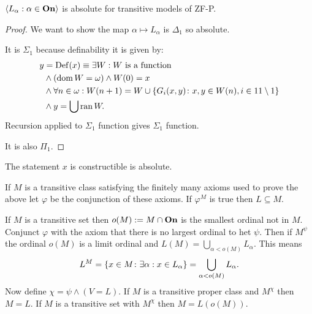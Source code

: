 \begin{proposition}
    \(\left<L_{\alpha}:\alpha\in{\bf On}\right>\) is absolute for transitive
    models of ZF-P.

    \begin{proof}
        We want to show the map \(\alpha\mapsto L_{\alpha}\) is \(\Delta_{1}\)
        so absolute.

        It is \(\Sigma_{1}\) because definability it is given by:
        \begin{align*}
            y & =\operatorname{Def}(x)\equiv\exists W:\textnormal{\(W\) is a function}                             \\
              & \wedge(\operatorname{dom} W=\omega)\wedge W(0)=x                                                         \\
              & \wedge\forall n\in\omega: W(n+1)=W\cup\left\{G_{i}(x,y)\colon x,y\in W(n),i\in 11\setminus 1\right\} \\
              & \wedge y=\bigcup\operatorname{ran} W.
        \end{align*}
        Recursion applied to \(\Sigma_{1}\) function gives \(\Sigma_{1}\)
        function.

        It is also \(\Pi_{1}\).
    \end{proof}
\end{proposition}

\begin{corollary}
    The statement \(x\) is constructible is absolute.
\end{corollary}

\begin{corollary}
    If \(M\) is a transitive class satisfying the finitely many axioms used to
    prove the above let \(\varphi\) be the conjunction of these axioms. If
    \(\varphi^{M}\) is true then \(L\subseteq M\).

    If \(M\) is a transitive set then \(o(M):=M\cap{\bf On}\) is the smallest
    ordinal not in \(M\). Conjunct \(\varphi\) with the axiom that there is no
    largest ordinal to het \(\psi\). Then if \(M^{\psi}\) the ordinal
    \(o(M)\) is a limit ordinal and \(L(M)=\bigcup_{\alpha<o(M)}L_{\alpha}\).
    This means
    \[
        L^{M}=\left\{x\in M\colon\exists\alpha:x\in L_{\alpha}\right\}=\bigcup_{\alpha<o(M)}L_{\alpha}.
    \]
    Now define \(\chi=\psi\wedge (V=L)\). If \(M\) is a transitive proper class
    and \(M^{\chi}\) then \(M=L\). If \(M\) is a transitive set with
    \(M^{\chi}\) then \(M=L(o(M))\).
\end{corollary}

